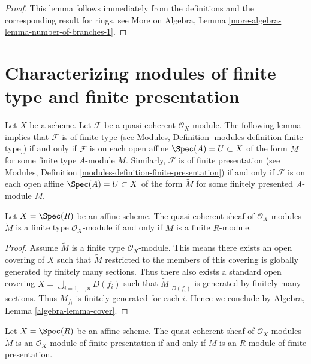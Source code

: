 \begin{proof}
This lemma follows immediately from the definitions and the corresponding
result for rings, see More on Algebra, Lemma
\ref{more-algebra-lemma-number-of-branches-1}.
\end{proof}






\section{Characterizing modules of finite type and finite presentation}
\label{section-characterizing-finite-type-presentation}

\noindent
Let $X$ be a scheme.
Let $\mathcal{F}$ be a quasi-coherent $\mathcal{O}_X$-module.
The following lemma implies that $\mathcal{F}$ is of finite type
(see Modules, Definition \ref{modules-definition-finite-type})
if and only if $\mathcal{F}$ is
on each open affine $\Spec(A) = U \subset X$
of the form $\widetilde M$ for some finite type $A$-module $M$.
Similarly, $\mathcal{F}$ is of finite presentation
(see Modules, Definition \ref{modules-definition-finite-presentation})
if and only if $\mathcal{F}$ is
on each open affine $\Spec(A) = U \subset X$
of the form $\widetilde M$ for some finitely presented $A$-module $M$.

\begin{lemma}
\label{lemma-finite-type-module}
Let $X = \Spec(R)$ be an affine scheme.
The quasi-coherent sheaf of $\mathcal{O}_X$-modules
$\widetilde M$ is a finite type $\mathcal{O}_X$-module
if and only if $M$ is a finite $R$-module.
\end{lemma}

\begin{proof}
Assume $\widetilde M$ is a finite type $\mathcal{O}_X$-module.
This means there exists an open covering of $X$ such that
$\widetilde M$ restricted to the members of this covering is
globally generated by finitely many sections.
Thus there also exists a standard open covering
$X = \bigcup_{i = 1, \ldots, n} D(f_i)$ such that $\widetilde M|_{D(f_i)}$
is generated by finitely many sections. Thus $M_{f_i}$ is finitely
generated for each $i$. Hence we conclude by
Algebra, Lemma \ref{algebra-lemma-cover}.
\end{proof}

\begin{lemma}
\label{lemma-finite-presentation-module}
Let $X = \Spec(R)$ be an affine scheme. The quasi-coherent sheaf
of $\mathcal{O}_X$-modules $\widetilde M$ is an $\mathcal{O}_X$-module of
finite presentation if and only if $M$ is an $R$-module of finite presentation.
\end{lemma}

